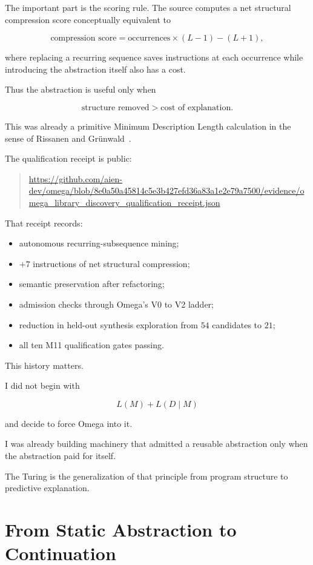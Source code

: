 \documentclass[11pt]{article}
\begin{document}
The important part is the scoring rule. The source computes a net structural compression score conceptually equivalent to

\[
\text{compression score}
=
\text{occurrences}\times(L-1)-(L+1),
\]

where replacing a recurring sequence saves instructions at each occurrence while introducing the abstraction itself also has a cost.

Thus the abstraction is useful only when

\[
\text{structure removed}
>
\text{cost of explanation}.
\]

This was already a primitive Minimum Description Length calculation in the sense of Rissanen and Grünwald~\cite{rissanen1978,grunwald2007}.

The qualification receipt is public:

\begin{quote}
\url{https://github.com/aien-dev/omega/blob/8e0a50a45814c5e3b427efd36a83a1e2e79a7500/evidence/omega_library_discovery_qualification_receipt.json}
\end{quote}

That receipt records:

\begin{itemize}
    \item autonomous recurring-subsequence mining;
    \item \(+7\) instructions of net structural compression;
    \item semantic preservation after refactoring;
    \item admission checks through Omega's V0 to V2 ladder;
    \item reduction in held-out synthesis exploration from \(54\) candidates to \(21\);
    \item all ten M11 qualification gates passing.
\end{itemize}

This history matters.

I did not begin with

\[
L(M)+L(D\mid M)
\]

and decide to force Omega into it.

I was already building machinery that admitted a reusable abstraction only when the abstraction paid for itself.

The Turing is the generalization of that principle from program structure to predictive explanation.

\section{From Static Abstraction to Continuation}
\end{document}
